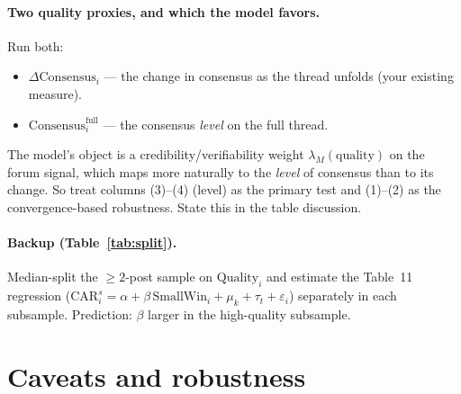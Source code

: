 \documentclass[11pt]{article}
\newcommand{\SmallWin}{\mathrm{SmallWin}}
\newcommand{\Cons}{\Delta\mathrm{Consensus}}
\newcommand{\ConsL}{\mathrm{Consensus}^{\mathrm{full}}}
\begin{document}
\paragraph{Two quality proxies, and which the model favors.} Run both:
\begin{itemize}[nosep]
  \item $\Cons_i$ --- the change in consensus as the thread unfolds (your existing measure).
  \item $\ConsL_i$ --- the consensus \emph{level} on the full thread.
\end{itemize}
The model's object is a credibility/verifiability weight $\lambda_M(\text{quality})$ on the
forum signal, which maps more naturally to the \emph{level} of consensus than to its
change. So treat columns (3)--(4) (level) as the primary test and (1)--(2) as the
convergence-based robustness. State this in the table discussion.

\paragraph{Backup (Table~\ref{tab:split}).} Median-split the $\ge 2$-post sample on
$\mathrm{Quality}_i$ and estimate the Table~11 regression
($\mathrm{CAR}^s_i = \alpha + \beta\,\SmallWin_i + \mu_k + \tau_t + \varepsilon_i$)
separately in each subsample. Prediction: $\beta$ larger in the high-quality subsample.

\section{Caveats and robustness}
\end{document}
